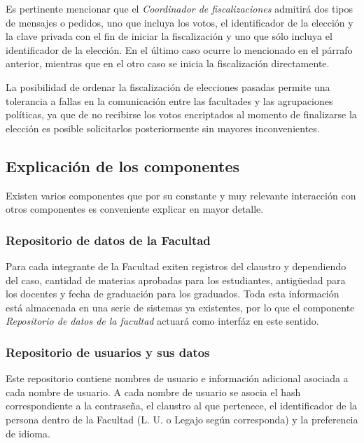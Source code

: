 Es pertinente mencionar que el \emph{Coordinador de fiscalizaciones} admitirá dos tipos de mensajes o pedidos, uno que incluya los votos, el identificador de la elección y la clave privada con el fin de iniciar la fiscalización y uno que sólo incluya el identificador de la elección. En el último caso ocurre lo mencionado en el párrafo anterior, mientras que en el otro caso se inicia la fiscalización directamente. 


La posibilidad de ordenar la fiscalización de elecciones pasadas permite una tolerancia a fallas en la comunicación entre las facultades y las agrupaciones políticas, ya que de no recibirse los votos encriptados al momento de finalizarse la elección es posible solicitarlos posteriormente sin mayores inconvenientes.





\subsection{Explicación de los componentes}
\label{explicaciones}
Existen varios componentes que por su constante y muy relevante interacción con otros componentes es conveniente explicar en mayor detalle.


\subsubsection{Repositorio de datos de la Facultad}
Para cada integrante de la Facultad exiten registros del claustro y dependiendo del caso, cantidad de materias aprobadas para los estudiantes, antigüedad para los docentes y fecha de graduación para los graduados. Toda esta información está almacenada en una serie de sistemas ya existentes, por lo que el componente \emph{Repositorio de datos de la facultad} actuará como interfáz en este sentido.


\subsubsection{Repositorio de usuarios y sus datos}


Este repositorio contiene nombres de usuario e información adicional asociada a cada nombre de usuario. A cada nombre de usuario se asocia el hash correspondiente a la contraseña, el claustro al que pertenece, el identificador de la persona dentro de la Facultad (L. U. o Legajo según corresponda) y la preferencia de idioma. 


